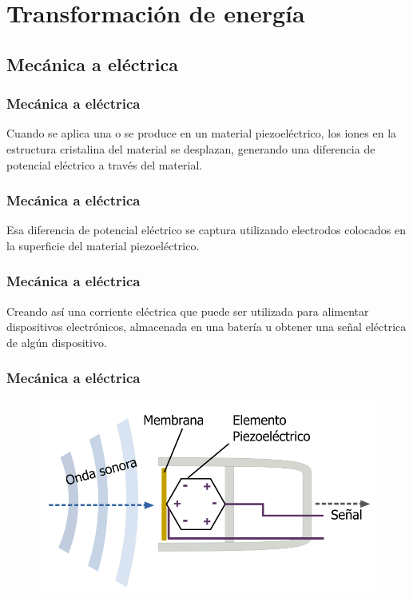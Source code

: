 \documentclass[14pt]{beamer}
\begin{document}
\section{Transformación de energía}
\subsection{Mecánica a eléctrica}

\begin{frame}
\frametitle{Mecánica a eléctrica}
Cuando se aplica una  o se produce  en un material piezoeléctrico, \pause los iones en la estructura cristalina del material se desplazan, \pause generando una diferencia de potencial eléctrico a través del material.
\end{frame}
\begin{frame}
\frametitle{Mecánica a eléctrica}    
Esa diferencia de potencial eléctrico se captura utilizando electrodos colocados en la superficie del material piezoeléctrico.
\end{frame}
\begin{frame}
\frametitle{Mecánica a eléctrica}
Creando así una corriente eléctrica que puede ser utilizada para alimentar dispositivos electrónicos,  almacenada en una batería u obtener una señal eléctrica de algún dispositivo.
\end{frame}
\begin{frame}
\frametitle{Mecánica a eléctrica}
\begin{figure}
    \centering
    \includegraphics[scale=0.5]{Imagenes/Piezoelectricidad_05.png}
\end{figure}
\end{frame}
\end{document}

